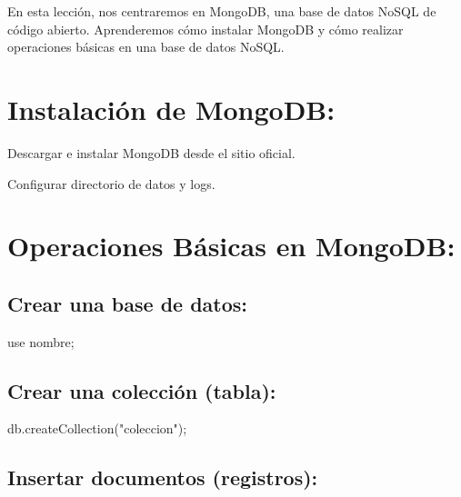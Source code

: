 \documentclass[
  a4paper,
  onepage,
  openany]{scrreprt}
\newenvironment{Shaded}{\begin{snugshade}}{\end{snugshade}}
\newcommand{\NormalTok}[1]{\textcolor[rgb]{0.00,0.23,0.31}{#1}}
\begin{document}
En esta lección, nos centraremos en MongoDB, una base de datos NoSQL de
código abierto. Aprenderemos cómo instalar MongoDB y cómo realizar
operaciones básicas en una base de datos NoSQL.

\hypertarget{instalaciuxf3n-de-mongodb}{%
\section{Instalación de MongoDB:}\label{instalaciuxf3n-de-mongodb}}

Descargar e instalar MongoDB desde el sitio oficial.

Configurar directorio de datos y logs.

\hypertarget{operaciones-buxe1sicas-en-mongodb}{%
\section{Operaciones Básicas en
MongoDB:}\label{operaciones-buxe1sicas-en-mongodb}}

\hypertarget{crear-una-base-de-datos-2}{%
\subsection{Crear una base de datos:}\label{crear-una-base-de-datos-2}}

\begin{Shaded}
\begin{Highlighting}[]
\NormalTok{use nombre;}
\end{Highlighting}
\end{Shaded}

\hypertarget{crear-una-colecciuxf3n-tabla}{%
\subsection{Crear una colección
(tabla):}\label{crear-una-colecciuxf3n-tabla}}

\begin{Shaded}
\begin{Highlighting}[]
\NormalTok{db.createCollection("coleccion");}
\end{Highlighting}
\end{Shaded}

\hypertarget{insertar-documentos-registros}{%
\subsection{Insertar documentos
(registros):}\label{insertar-documentos-registros}}
\end{document}
